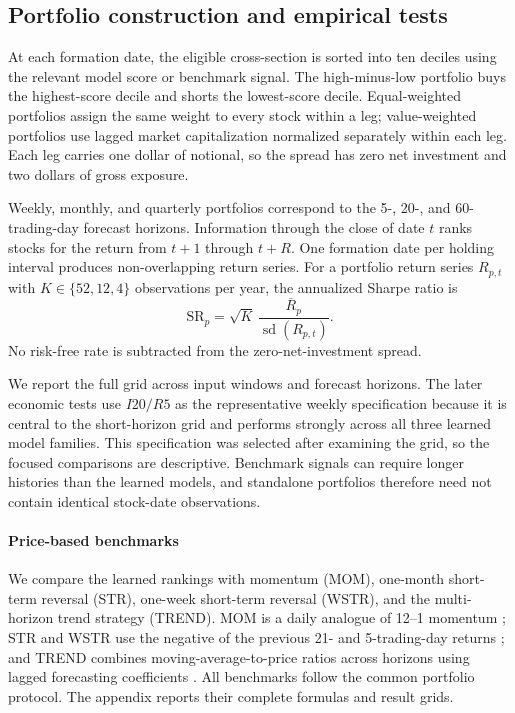 \subsection{Portfolio construction and empirical tests}\label{subsec:portfolios}

At each formation date, the eligible cross-section is sorted into ten deciles using the relevant model score or benchmark signal. The high-minus-low portfolio buys the highest-score decile and shorts the lowest-score decile. Equal-weighted portfolios assign the same weight to every stock within a leg; value-weighted portfolios use lagged market capitalization normalized separately within each leg. Each leg carries one dollar of notional, so the spread has zero net investment and two dollars of gross exposure.

Weekly, monthly, and quarterly portfolios correspond to the 5-, 20-, and 60-trading-day forecast horizons. Information through the close of date $t$ ranks stocks for the return from $t+1$ through $t+R$. One formation date per holding interval produces non-overlapping return series. For a portfolio return series $R_{p,t}$ with $K\in\{52,12,4\}$ observations per year, the annualized Sharpe ratio is
\begin{equation}
 \mathrm{SR}_{p}=\sqrt{K}\,\frac{\overline{R}_{p}}{\operatorname{sd}(R_{p,t})}.
 \label{eq:sharpe}
\end{equation}
No risk-free rate is subtracted from the zero-net-investment spread.

We report the full grid across input windows and forecast horizons. The later economic tests use $I20/R5$ as the representative weekly specification because it is central to the short-horizon grid and performs strongly across all three learned model families. This specification was selected after examining the grid, so the focused comparisons are descriptive. Benchmark signals can require longer histories than the learned models, and standalone portfolios therefore need not contain identical stock-date observations.

\paragraph{Price-based benchmarks} We compare the learned rankings with momentum (MOM), one-month short-term reversal (STR), one-week short-term reversal (WSTR), and the multi-horizon trend strategy (TREND). MOM is a daily analogue of 12--1 momentum \parencite{jegadeeshReturnsBuyingWinners1993a}; STR and WSTR use the negative of the previous 21- and 5-trading-day returns \parencite{jegadeeshEvidencePredictableBehavior1990,lehmannFadsMartingalesMarket1990}; and TREND combines moving-average-to-price ratios across horizons using lagged forecasting coefficients \parencite{hanTrendFactorAny2016}. All benchmarks follow the common portfolio protocol. The appendix reports their complete formulas and result grids.

